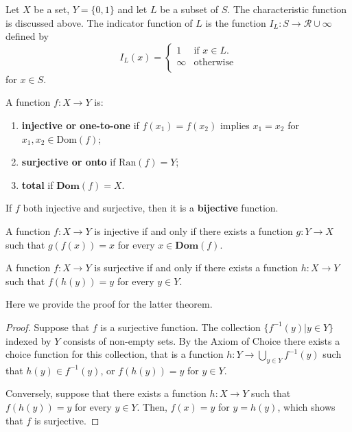\documentclass[../main.tex]{subfiles}
\begin{document}
\begin{purple}
\begin{definition}
Let $X$ be a set, $Y = \{0, 1\}$ and let $L$ be a subset of $S$. The characteristic function is discussed above. The indicator function of $L$ is the function $I_L: S\rightarrow \mathcal{R}\cup \infty$ defined by 
$$
I_L(x)=\begin{cases}
    1&\text{if }x\in L.\\
    \infty&\text{otherwise}\\
\end{cases}
$$
for $x\in S$.
\end{definition}
\end{purple}

\begin{purple}
\begin{definition}
A function $f: X\rightarrow Y$ is:
\begin{enumerate}
    \item \textbf{injective or one-to-one} if $f(x_1)=f(x_2)$ implies $x_1=x_2$ for $x_1, x_2\in \text{Dom}(f)$;
    \item \textbf{surjective or onto} if $\text{Ran}(f) = Y$;
    \item \textbf{total} if $\textbf{Dom}(f) = X$.
\end{enumerate}

If $f$ both injective and surjective, then it is a \textbf{bijective} function.
\end{definition}
\end{purple}

\begin{yellow}
\begin{theorem}
A function $f: X\rightarrow Y$ is injective if and only if there exists a function $g: Y\rightarrow X$ such that $g(f(x))=x$ for every $x\in \textbf{Dom}(f)$. 

A function $f: X\rightarrow Y$ is surjective if and only if there exists a function $h: X\rightarrow Y$ such that $f(h(y))=y$ for every $y\in Y$. 
\end{theorem}
\end{yellow}

Here we provide the proof for the latter theorem.

\begin{proof}
Suppose that $f$ is a surjective function. The collection $\{f^{-1}(y)|y\in Y\}$ indexed by $Y$ consists of non-empty sets. By the Axiom of Choice there exists a choice function for this collection, that is a function $h: Y\rightarrow \bigcup_{y\in Y}f^{-1}(y)$ such that $h(y)\in f^{-1}(y)$, or $f(h(y))=y$ for $y\in Y$.

Conversely, suppose that there exists a function $h: X\rightarrow Y$ such that $f(h(y))=y$ for every $y\in Y$. Then, $f(x)=y$ for $y=h(y)$, which shows that $f$ is surjective.
\end{proof}
\end{document}
